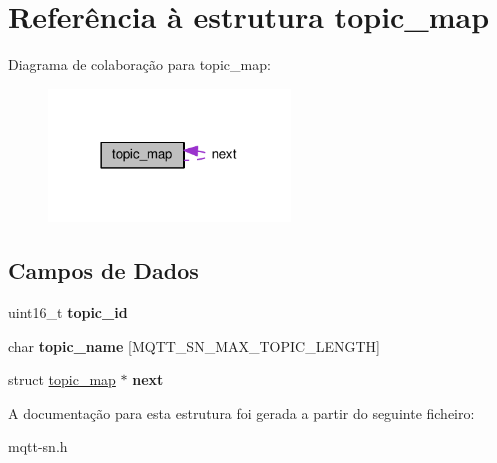 \hypertarget{structtopic__map}{\section{Referência à estrutura topic\+\_\+map}
\label{structtopic__map}
}


Diagrama de colaboração para topic\+\_\+map\+:\nopagebreak
\begin{figure}[H]
\begin{center}
\leavevmode
\includegraphics[width=182pt]{structtopic__map__coll__graph}
\end{center}
\end{figure}
\subsection*{Campos de Dados}
\begin{DoxyCompactItemize}
\item 
\hypertarget{structtopic__map_ad562f54acc5597130e0710c356963dff}{uint16\+\_\+t {\bfseries topic\+\_\+id}}\label{structtopic__map_ad562f54acc5597130e0710c356963dff}

\item 
\hypertarget{structtopic__map_a3682faf73e58b07c78516bab6be65755}{char {\bfseries topic\+\_\+name} \mbox{[}M\+Q\+T\+T\+\_\+\+S\+N\+\_\+\+M\+A\+X\+\_\+\+T\+O\+P\+I\+C\+\_\+\+L\+E\+N\+G\+T\+H\mbox{]}}\label{structtopic__map_a3682faf73e58b07c78516bab6be65755}

\item 
\hypertarget{structtopic__map_a3d6fd10a57eb728c0369d32daddb4b4c}{struct \hyperlink{structtopic__map}{topic\+\_\+map} $\ast$ {\bfseries next}}\label{structtopic__map_a3d6fd10a57eb728c0369d32daddb4b4c}

\end{DoxyCompactItemize}


A documentação para esta estrutura foi gerada a partir do seguinte ficheiro\+:\begin{DoxyCompactItemize}
\item 
mqtt-\/sn.\+h\end{DoxyCompactItemize}
